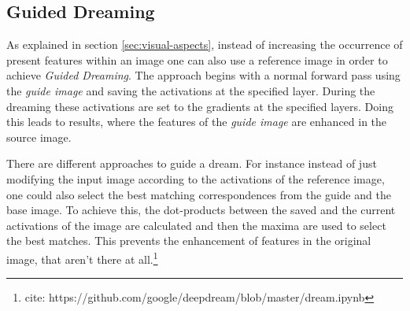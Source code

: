 \subsection{Guided Dreaming}
\label{guided-dreaming}
As explained in section \ref{sec:visual-aspects}, instead of increasing the occurrence of present features within an image one can also use a reference image in order to achieve \emph{Guided Dreaming}.
The approach begins with a normal forward pass using the \emph{guide image} and saving the activations at the specified layer.
During the dreaming these activations are set to the gradients at the specified layers.
Doing this leads to results, where the features of the \emph{guide image} are enhanced in the source image.


There are different approaches to guide a dream.
For instance instead of just modifying the input image according to the activations of the reference image, one could also select the best matching correspondences from the guide and the base image.
To achieve this, the dot-products between the saved and the current activations of the image are calculated and then the maxima are used to select the best matches.
This prevents the enhancement of  features in the original image, that aren't there at all.\footnote{cite: https://github.com/google/deepdream/blob/master/dream.ipynb}


